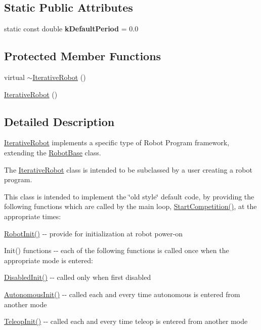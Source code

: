 \subsection*{Static Public Attributes}
\begin{DoxyCompactItemize}
\item 
\hypertarget{classIterativeRobot_af4d4e42da2c2c2b805c5d0d7452c7f00}{
static const double {\bfseries kDefaultPeriod} = 0.0}
\label{classIterativeRobot_af4d4e42da2c2c2b805c5d0d7452c7f00}

\end{DoxyCompactItemize}
\subsection*{Protected Member Functions}
\begin{DoxyCompactItemize}
\item 
virtual \hyperlink{classIterativeRobot_a0d80a18c34ba474248a806ed0ea5ad74}{$\sim$IterativeRobot} ()
\item 
\hyperlink{classIterativeRobot_a7ec0b439b50ba3bc7ca34a6ed1653304}{IterativeRobot} ()
\end{DoxyCompactItemize}


\subsection{Detailed Description}
\hyperlink{classIterativeRobot}{IterativeRobot} implements a specific type of Robot Program framework, extending the \hyperlink{classRobotBase}{RobotBase} class.

The \hyperlink{classIterativeRobot}{IterativeRobot} class is intended to be subclassed by a user creating a robot program.

This class is intended to implement the \char`\"{}old style\char`\"{} default code, by providing the following functions which are called by the main loop, \hyperlink{classIterativeRobot_ab0af04a781b0390981b9f0dd75358515}{StartCompetition()}, at the appropriate times:

\hyperlink{classIterativeRobot_a5296334b4a48ad2123c29f49209b9f62}{RobotInit()} -\/-\/ provide for initialization at robot power-\/on

Init() functions -\/-\/ each of the following functions is called once when the appropriate mode is entered:
\begin{DoxyItemize}
\item \hyperlink{classIterativeRobot_a428a5875274cb886730530d633a50db9}{DisabledInit()} -\/-\/ called only when first disabled
\item \hyperlink{classIterativeRobot_aa936c0a4526e12e32defd50609cca90c}{AutonomousInit()} -\/-\/ called each and every time autonomous is entered from another mode
\item \hyperlink{classIterativeRobot_a7365e781f0a04674b94bb1fb5767d83e}{TeleopInit()} -\/-\/ called each and every time teleop is entered from another mode
\end{DoxyItemize}

